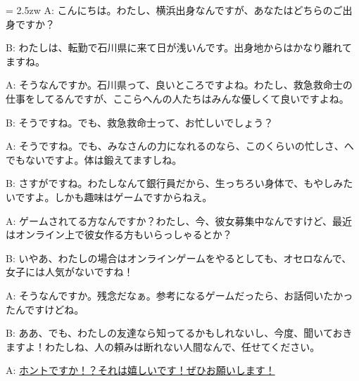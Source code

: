 \documentclass[11pt]{amsart}
\title{}
\author{}
\newenvironment{hangall}[1]{\hangindent = 2.5zw\everypar{\hangindent = 2.5zw}}{}
\begin{document}
\maketitle
\begin{hangall}{}%
A: こんにちは。わたし、横浜出身なんですが、あなたはどちらのご出身ですか？

B: わたしは、転勤で石川県に来て日が浅いんです。出身地からはかなり離れてますね。

A: そうなんですか。石川県って、良いところですよね。わたし、救急救命士の仕事をしてるんですが、ここらへんの人たちはみんな優しくて良いですよね。

B: そうですね。でも、救急救命士って、お忙しいでしょう？

A: そうですね。でも、みなさんの力になれるのなら、このくらいの忙しさ、へでもないですよ。体は鍛えてますしね。

B: さすがですね。わたしなんて銀行員だから、生っちろい身体で、もやしみたいですよ。しかも趣味はゲームですからねえ。

A: ゲームされてる方なんですか？わたし、今、彼女募集中なんですけど、最近はオンライン上で彼女作る方もいらっしゃるとか？

B: いやあ、わたしの場合はオンラインゲームをやるとしても、オセロなんで、女子には人気がないですね！

A: そうなんですか。残念だなぁ。参考になるゲームだったら、お話伺いたかったんですけどね。

B: ああ、でも、わたしの友達なら知ってるかもしれないし、今度、聞いておきますよ！わたしね、人の頼みは断れない人間なんで、任せてください。

A: \ul{ホントですか！？それは嬉しいです！ぜひお願いします！}\end{hangall}
\end{document}
